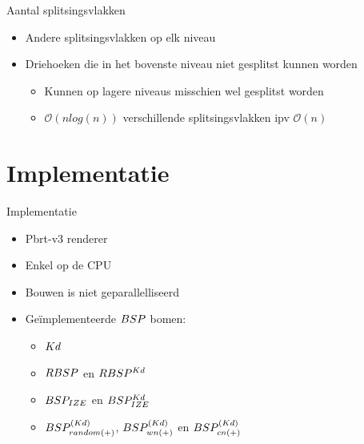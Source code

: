 \documentclass[11pt,t]{beamer}
\begin{document}
\begin{frame}{Aantal splitsingsvlakken}
	\begin{itemize}
		\item Andere splitsingsvlakken op elk niveau
	\end{itemize}
\begin{itemize}
	\item Driehoeken die in het bovenste niveau niet gesplitst kunnen worden
	\begin{itemize}
		\item Kunnen op lagere niveaus misschien wel gesplitst worden
		\item $\mathcal{O}(nlog(n))$ verschillende splitsingsvlakken ipv $\mathcal{O}(n)$
	\end{itemize}
\end{itemize}
\end{frame}

\section{Implementatie}

\begin{frame}{Implementatie}
	\begin{itemize}
		\item Pbrt-v3 renderer
		\item Enkel op de CPU
		\item Bouwen is niet geparallelliseerd
		\item Geïmplementeerde $BSP$ bomen:
			\begin{itemize}
				\item $Kd$
				\item $RBSP$ en $RBSP^{Kd}$
				\item $BSP_{IZE}$ en $BSP^{Kd}_{IZE}$
				\item $BSP^{(Kd)}_{random(+)}$, $BSP^{(Kd)}_{wn(+)}$ en $BSP^{(Kd)}_{cn(+)}$				
			\end{itemize}
	\end{itemize}
\end{frame}
\end{document}
